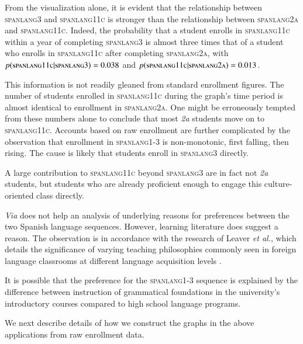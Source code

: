 From the visualization alone, it is evident that the relationship
between \textsc{spanlang3} and \textsc{spanlang11c} is stronger than
the relationship between \textsc{spanlang2a} and
\textsc{spanlang11c}. Indeed, the probability that a student enrolls
in \textsc{spanlang11c} within a year of completing \textsc{spanlang3}
is almost three times that of a student who enrolls in
\textsc{spanlang11c} after completing \textsc{spanlang2a}, with
$p(\textsc{spanlang11c}|\textsc{spanlang3}) = 0.038$ and
$p(\textsc{spanlang11c}|\textsc{spanlang2a}) = 0.013$.

This information is not readily gleaned from standard enrollment
figures. The number of students enrolled in \textsc{spanlang11c}
during the graph's time period is almost identical to enrollment in
\textsc{spanlang2a}. One might be erroneously tempted from these
numbers alone to conclude that most {\em 2a} students move on to
\textsc{spanlang11c}. Accounts based on raw enrollment are further
complicated by the observation that enrollment in \textsc{spanlang1-3}
is non-monotonic, first falling, then rising. The cause is
likely that students enroll in \textsc{spanlang3} directly.

A large contribution to \textsc{spanlang11c} beyond \textsc{spanlang3}
are in fact not {\em 2a} students, but students who are already
proficient enough to engage this culture-oriented class directly.

{\em Via} does not help an analysis of underlying reasons for
preferences between the two Spanish language sequences. However,
learning literature does suggest a reason. The observation is in
accordance with the research of Leaver \textit{et al.}, which details
the significance of varying teaching philosophies commonly seen in
foreign language classrooms at different language acquisition levels
\cite{Leaver2002}.

It is possible that the preference for the \textsc{spanlang1-3}
sequence is explained by the difference between instruction of
grammatical foundations in the university's introductory courses
compared to high school language programs.

We next describe details of how we construct the graphs in the above
applications from raw enrollment data.
